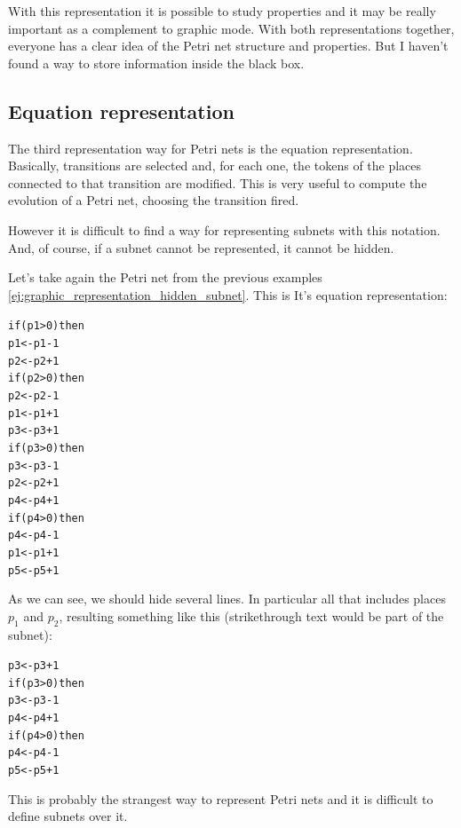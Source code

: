 With this representation it is possible to study properties and it may be really important
as a complement to graphic mode. With both representations together, everyone has a clear idea of the Petri net structure and properties.  But I haven't
found a way to store information inside the black box. 

\subsection{Equation representation}
The third representation way for Petri nets is the equation representation.
Basically, transitions are selected and, for each one, the tokens of the places
connected to that transition are modified. This is very useful to compute
the evolution of a Petri net, choosing the transition fired.

However it is difficult to find a way for representing subnets with this
notation. And, of course, if a subnet cannot be represented, it cannot be
hidden. 

\begin{example}
\label{ej:equation_representation_hidden_subnet}
Let's take again the Petri net from the previous examples \ref{ej:graphic_representation_hidden_subnet}.
This is It's equation representation:

\begin{scriptsize}
\begin{alltt}
if (p1>0) then
        p1 <- p1 - 1
        p2 <- p2 + 1
if (p2>0) then
        p2 <- p2 - 1
        p1 <- p1 + 1
        p3 <- p3 + 1
if (p3>0) then
        p3 <- p3 - 1
        p2 <- p2 + 1
        p4 <- p4 + 1
if (p4>0) then
        p4 <- p4 - 1
        p1 <- p1 + 1
        p5 <- p5 + 1
\end{alltt}
\end{scriptsize}

As we can see, we should hide several lines. In particular all that includes
places $p_1$ and $p_2$, resulting something like this (strikethrough text
would be part of the subnet):

\begin{scriptsize}
\begin{alltt}
        p3 <- p3 + 1
if (p3>0) then
        p3 <- p3 - 1
        p4 <- p4 + 1
if (p4>0) then
        p4 <- p4 - 1
        p5 <- p5 + 1
\end{alltt}
\end{scriptsize}

This is probably the strangest way to represent Petri nets and it is difficult
to define subnets over it.

\end{example}


